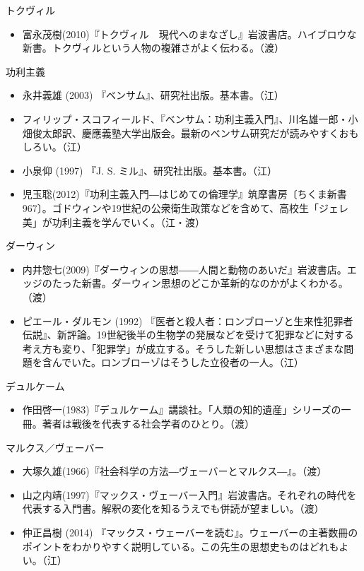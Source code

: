 \documentclass[dvipdfmx]{jsarticle}
\begin{document}
トクヴィル
\begin{itemize}
\item 富永茂樹(2010)『トクヴィル　現代へのまなざし』岩波書店。ハイブロウな新書。トクヴィルという人物の複雑さがよく伝わる。（渡）
\end{itemize}

功利主義
\begin{itemize}
\item 永井義雄 (2003) 『ベンサム』、研究社出版。基本書。（江）
\item フィリップ・スコフィールド、『ベンサム：功利主義入門』、川名雄一郎・小畑俊太郎訳、慶應義塾大学出版会。最新のベンサム研究だが読みやすくおもしろい。（江）
\item 小泉仰 (1997) 『J. S. ミル』、研究社出版。基本書。（江）
\item 児玉聡(2012)『功利主義入門―はじめての倫理学』筑摩書房〔ちくま新書967〕。ゴドウィンや19世紀の公衆衛生政策などを含めて、高校生「ジェレ美」が功利主義を学んでいく。（江・渡）
\end{itemize}

ダーウィン
\begin{itemize}
\item 内井惣七(2009)『ダーウィンの思想――人間と動物のあいだ』岩波書店。エッジのたった新書。ダーウィン思想のどこか革新的なのかがよくわかる。（渡）
\item ピエール・ダルモン (1992) 『医者と殺人者：ロンブローゾと生来性犯罪者伝説』、新評論。19世紀後半の生物学の発展などを受けて犯罪などに対する考え方も変り、「犯罪学」が成立する。そうした新しい思想はさまざまな問題を含んでいた。ロンブローゾはそうした立役者の一人。（江）
\end{itemize}

デュルケーム
\begin{itemize}
\item 作田啓一(1983)『デュルケーム』講談社。「人類の知的遺産」シリーズの一冊。著者は戦後を代表する社会学者のひとり。（渡）
\end{itemize}

マルクス／ヴェーバー

\begin{itemize}
\item 大塚久雄(1966)『社会科学の方法―ヴェーバーとマルクス―』。（渡）
\item 山之内靖(1997)『マックス・ヴェーバー入門』岩波書店。それぞれの時代を代表する入門書。解釈の変化を知るうえでも併読が望ましい。（渡）
\item 仲正昌樹 (2014) 『マックス・ウェーバーを読む』。ウェーバーの主著数冊のポイントをわかりやすく説明している。この先生の思想史ものはどれもよい。（江）
\end{itemize}
\end{document}
